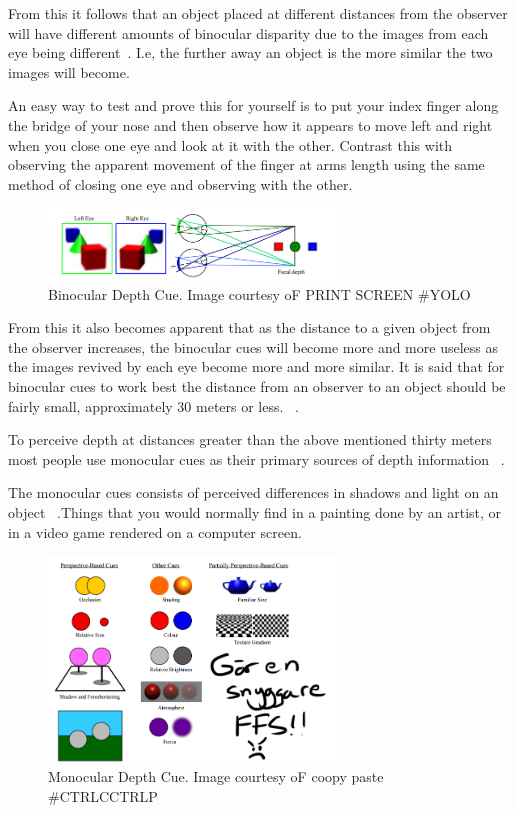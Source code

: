 \documentclass[tog]{acmsiggraph}
\begin{document}
From this it follows that an object placed at different distances from the observer will have different amounts of binocular disparity due to the images from each eye being different~\cite {Boyd:2000:DPC}. I.e, the further away an object is the more similar the two images will become. 

An easy way to test and prove this for yourself is to put your index finger along the bridge of your nose and then observe how it appears to move left and right when you close one eye and look at it with the other. Contrast this with observing the apparent movement of the finger at arms length using the same method of closing one eye and observing with the other.   

\begin{figure}[ht]
	\centering
	\includegraphics[width=3.0in]{images/depthCuesBinocular}
	\caption{Binocular Depth Cue. Image courtesy oF PRINT SCREEN \#YOLO}
	\label{fig:DepthPerception}
\end{figure}
 
From this it also becomes apparent that as the distance to a given object from the observer increases, the binocular cues will become more and more useless as the images revived by each eye become more and more similar. It is said that for binocular cues to work best the distance from an observer to an object should be fairly small, approximately 30 meters or less. ~\cite {Palvqvist:2013:DPDS}.

To perceive depth at distances greater than the above mentioned thirty meters most people use monocular cues as their primary sources of depth information ~\cite {Palvqvist:2013:DPDS}. 

The monocular cues consists of perceived differences in shadows and light on an object ~\cite {Pfautz:2002:DPCG}.Things that you would normally find in a painting done by an artist, or in a video game rendered on a computer screen.

\begin{figure}[ht]
	\centering
	\includegraphics[width=3.0in]{images/depthCues}
	\caption{Monocular Depth Cue. Image courtesy oF coopy paste \#CTRLCCTRLP}
	\label{fig:DepthPerception}
\end{figure}
\end{document}
